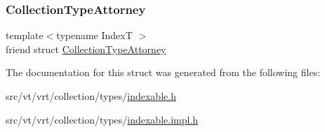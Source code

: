 \subsubsection{\texorpdfstring{Collection\+Type\+Attorney}{CollectionTypeAttorney}}
{\footnotesize\ttfamily template$<$typename IndexT $>$ \\
friend struct \hyperlink{structvt_1_1vrt_1_1collection_1_1_collection_type_attorney}{Collection\+Type\+Attorney}\hspace{0.3cm}{\ttfamily [friend]}}



The documentation for this struct was generated from the following files\+:\begin{DoxyCompactItemize}
\item 
src/vt/vrt/collection/types/\hyperlink{indexable_8h}{indexable.\+h}\item 
src/vt/vrt/collection/types/\hyperlink{indexable_8impl_8h}{indexable.\+impl.\+h}\end{DoxyCompactItemize}
